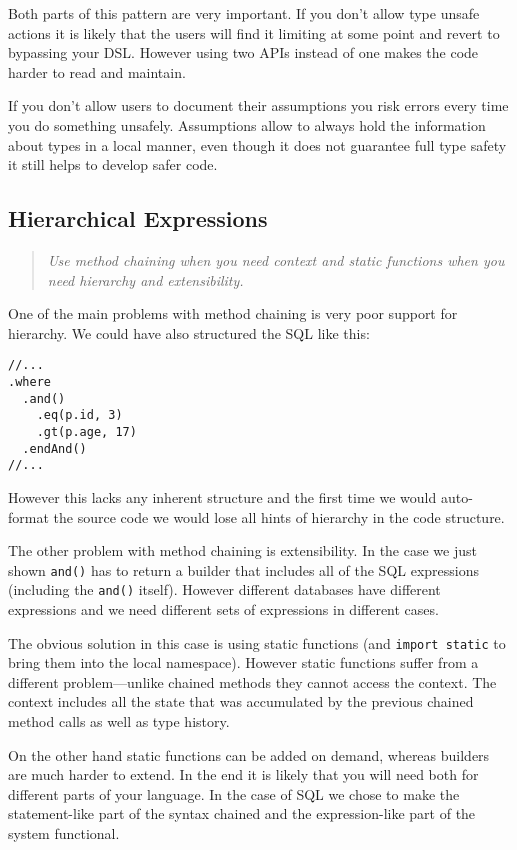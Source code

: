 \documentclass{sig-alternate}
\begin{document}
Both parts of this pattern are very important. If you don't allow type unsafe actions it is likely that the users will find it limiting at some point and revert to bypassing your DSL. However using two APIs instead of one makes the code harder to read and maintain.

If you don't allow users to document their assumptions you risk errors every time you do something unsafely. Assumptions allow to always hold the information about types in a local manner, even though it does not guarantee full type safety it still helps to develop safer code.

\subsection{Hierarchical Expressions}

\begin{quote}
\emph{Use method chaining when you need context and static functions when you need hierarchy and extensibility.}
\end{quote}

One of the main problems with method chaining is very poor support for hierarchy. We could have also structured the SQL like this:
\begin{verbatim}
//...
.where
  .and()
    .eq(p.id, 3)
    .gt(p.age, 17)
  .endAnd()
//...  
\end{verbatim}
However this lacks any inherent structure and the first time we would auto-format the source code we would lose all hints of hierarchy in the code structure.

The other problem with method chaining is extensibility. In the case we just shown \verb!and()! has to return a builder that includes all of the SQL expressions (including the \verb!and()! itself). However different databases have different expressions and we need different sets of expressions in different cases.

The obvious solution in this case is using static functions (and \verb!import static! to bring them into the local namespace). However static functions suffer from a different problem---unlike chained methods they cannot access the context. The context includes all the state that was accumulated by the previous chained method calls as well as type history. 

On the other hand static functions can be added on demand, whereas builders are much harder to extend. In the end it is likely that you will need both for different parts of your language. In the case of SQL we chose to make the statement-like part of the syntax chained and the expression-like part of the system functional.
\end{document}
